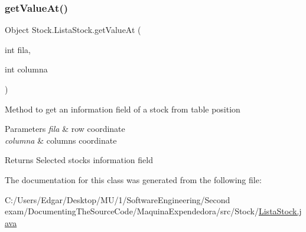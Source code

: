 \subsubsection{\texorpdfstring{get\+Value\+At()}{getValueAt()}}
{\footnotesize\ttfamily Object Stock.\+Lista\+Stock.\+get\+Value\+At (\begin{DoxyParamCaption}\item[{int}]{fila,  }\item[{int}]{columna }\end{DoxyParamCaption})\hspace{0.3cm}{\ttfamily [inline]}}

Method to get an information field of a stock from table position 
\begin{DoxyParams}{Parameters}
{\em fila} & row coordinate \\
\hline
{\em columna} & columns coordinate \\
\hline
\end{DoxyParams}
\begin{DoxyReturn}{Returns}
Selected stock\textquotesingle{}s information field 
\end{DoxyReturn}


The documentation for this class was generated from the following file\+:\begin{DoxyCompactItemize}
\item 
C\+:/\+Users/\+Edgar/\+Desktop/\+M\+U/1/\+Software\+Engineering/\+Second exam/\+Documenting\+The\+Source\+Code/\+Maquina\+Expendedora/src/\+Stock/\mbox{\hyperlink{_lista_stock_8java}{Lista\+Stock.\+java}}\end{DoxyCompactItemize}
